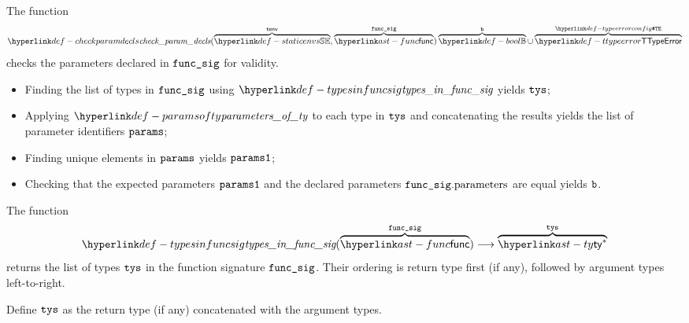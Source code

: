 \hypertarget{def-checkparamdecls}{}
The function
\[
\checkparamdecls(\overname{\staticenvs}{\tenv}, \overname{\func}{\funcsig}) \overname{\Bool}{\vb} \cup \overname{\TTypeError}{\TypeErrorConfig}
\]
checks the parameters declared in $\funcsig$ for validity.

\ProseParagraph
\AllApply
\begin{itemize}
  \item Finding the list of types in $\funcsig$ using $\typesinfuncsig$ yields $\tys$;
  \item Applying $\paramsofty$ to each type in $\tys$ and concatenating the results yields the list of parameter identifiers $\params$;
  \item Finding unique elements in $\params$ yields $\paramsone$;
  \item Checking that the expected parameters $\paramsone$ and the declared parameters $\funcsig.\funcparameters$ are equal yields $\vb$\ProseOrTypeError.
\end{itemize}

\FormallyParagraph
\begin{mathpar}
\end{mathpar}

\hypertarget{def-typesinfuncsig}{}
The function
\[
\typesinfuncsig(\overname{\func}{\funcsig}) \aslto \overname{\ty^*}{\tys}
\]
returns the list of types $\tys$ in the function signature $\funcsig$.
Their ordering is return type first (if any), followed by argument types left-to-right.

\ProseParagraph
Define $\tys$ as the return type (if any) concatenated with the argument types.

\FormallyParagraph
\begin{mathpar}
\end{mathpar}


